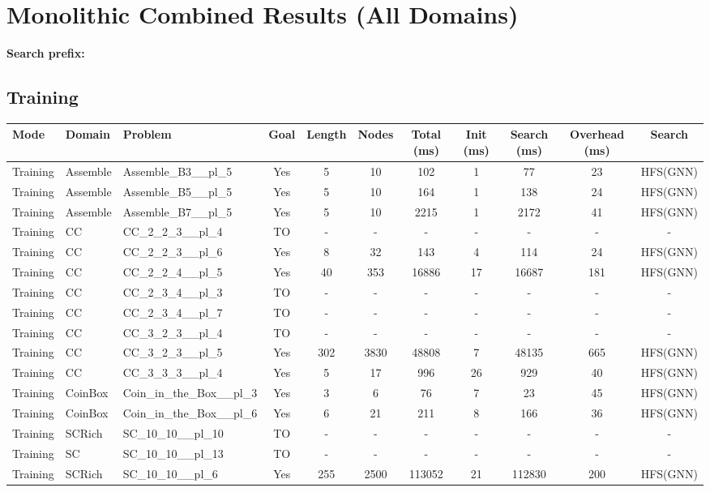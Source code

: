 \documentclass{article}
\begin{document}
\section*{Monolithic Combined Results (All Domains)}
\textbf{Search prefix:} 
\\[0.5cm]
\subsection*{Training}
\begin{tabular}{lllcccccccc}
\toprule
Mode & Domain & Problem & Goal & Length & Nodes & Total (ms) & Init (ms) & Search (ms) & Overhead (ms) & Search \\
\midrule
Training & Assemble & Assemble\_B3\_\_pl\_5 & Yes & 5 & 10 & 102 & 1 & 77 & 23 & HFS(GNN) \\
Training & Assemble & Assemble\_B5\_\_pl\_5 & Yes & 5 & 10 & 164 & 1 & 138 & 24 & HFS(GNN) \\
Training & Assemble & Assemble\_B7\_\_pl\_5 & Yes & 5 & 10 & 2215 & 1 & 2172 & 41 & HFS(GNN) \\
Training & CC & CC\_2\_2\_3\_\_pl\_4 & TO & - & - & - & - & - & - & - \\
Training & CC & CC\_2\_2\_3\_\_pl\_6 & Yes & 8 & 32 & 143 & 4 & 114 & 24 & HFS(GNN) \\
Training & CC & CC\_2\_2\_4\_\_pl\_5 & Yes & 40 & 353 & 16886 & 17 & 16687 & 181 & HFS(GNN) \\
Training & CC & CC\_2\_3\_4\_\_pl\_3 & TO & - & - & - & - & - & - & - \\
Training & CC & CC\_2\_3\_4\_\_pl\_7 & TO & - & - & - & - & - & - & - \\
Training & CC & CC\_3\_2\_3\_\_pl\_4 & TO & - & - & - & - & - & - & - \\
Training & CC & CC\_3\_2\_3\_\_pl\_5 & Yes & 302 & 3830 & 48808 & 7 & 48135 & 665 & HFS(GNN) \\
Training & CC & CC\_3\_3\_3\_\_pl\_4 & Yes & 5 & 17 & 996 & 26 & 929 & 40 & HFS(GNN) \\
Training & CoinBox & Coin\_in\_the\_Box\_\_pl\_3 & Yes & 3 & 6 & 76 & 7 & 23 & 45 & HFS(GNN) \\
Training & CoinBox & Coin\_in\_the\_Box\_\_pl\_6 & Yes & 6 & 21 & 211 & 8 & 166 & 36 & HFS(GNN) \\
Training & SCRich & SC\_10\_10\_\_pl\_10 & TO & - & - & - & - & - & - & - \\
Training & SC & SC\_10\_10\_\_pl\_13 & TO & - & - & - & - & - & - & - \\
Training & SCRich & SC\_10\_10\_\_pl\_6 & Yes & 255 & 2500 & 113052 & 21 & 112830 & 200 & HFS(GNN) \\

\end{tabular}
\end{document}

